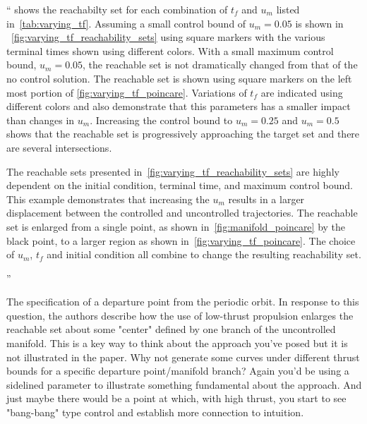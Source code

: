 \documentclass[11pt]{article}
\newenvironment{correction}{\begin{list}{}{\setlength{\leftmargin}{1cm}\setlength{\rightmargin}{1cm}}\vspace{\parsep}\item[]``}{''\end{list}}
\begin{document}
\begin{itemize}
\begin{correction}
             shows the reachabilty set for each combination of \(t_f\) and \( u_m\) listed in~\cref{tab:varying_tf}.
            Assuming a small control bound of \( u_m = \num{0.05} \) is shown in ~\cref{fig:varying_tf_reachability_sets} using square markers with the various terminal times shown using different colors.
            With a small maximum control bound, \( u_m = \num{0.05} \), the reachable set is not dramatically changed from that of the no control solution.
            The reachable set is shown using square markers on the left most portion of \cref{fig:varying_tf_poincare}.
            Variations of \( t_f\) are indicated using different colors and also demonstrate that this parameters has a smaller impact than changes in \( u_m \).
            Increasing the control bound to \( u_m = \num{0.25} \) and \( u_m = \num{0.5} \) shows that the reachable set is progressively approaching the target set and there are several intersections.

            The reachable sets presented in~\cref{fig:varying_tf_reachability_sets} are highly dependent on the initial condition, terminal time, and maximum control bound. 
            This example demonstrates that increasing the \( u_m \) results in a larger displacement between the controlled and uncontrolled trajectories.
            The reachable set is enlarged from a single point, as shown in~\cref{fig:manifold_poincare} by the black point, to a larger region as shown in~\cref{fig:varying_tf_poincare}.
            The choice of \( u_m\), \( t_f \) and initial condition all combine to change the resulting reachability set. 

        \end{correction}
    \item 
        \begin{itshape}
            The specification of a departure point from the periodic orbit.  In response to this question, the authors describe how the use of low-thrust propulsion enlarges the reachable set about some "center" defined by one branch of the uncontrolled manifold.  This is a key way to think about the approach you've posed but it is not illustrated in the paper.  Why not generate some curves under different thrust bounds for a specific departure point/manifold branch?  Again you'd be using a sidelined parameter to illustrate something fundamental about the approach.  And just maybe there would be a point at which, with high thrust, you start to see "bang-bang" type control and establish more connection to intuition.  
        \end{itshape}
    

\end{itemize}
\end{document}

